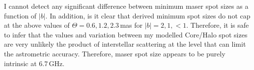         I cannot detect any significant difference between minimum maser spot sizes as a function of $|b|$. In addition, is it clear that derived minimum spot sizes do not cap at the above values of $\Theta=0.6,1.2,2.3$\,mas for $|b|=2,1,<1$. Therefore, it is safe to infer that the values and variation between my modelled Core/Halo spot sizes are very unlikely the product of interstellar scattering at the level that can limit the astrometric accuracy. Therefore, maser spot size appears to be purely intrinsic at 6.7\,GHz. %
%      
